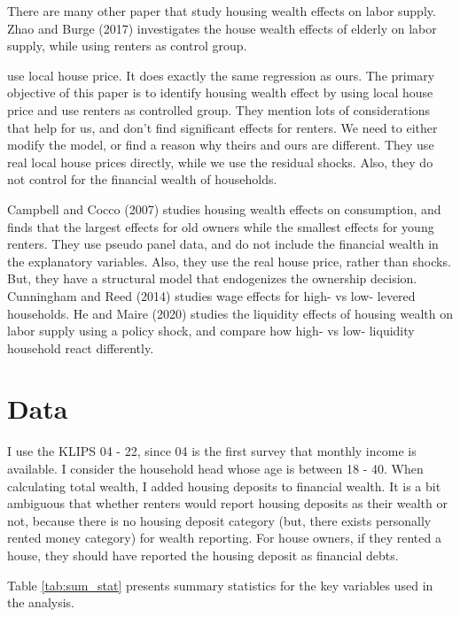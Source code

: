 \documentclass[10pt]{article}
\theoremstyle{definition}
\theoremstyle{remark}
\begin{document}
There are many other paper that study housing wealth effects on labor supply. Zhao and Burge (2017) investigates the house wealth effects of elderly on labor supply, while using renters as control group.

\cite{DG2018} use local house price. It does exactly the same regression as ours. The primary objective of this paper is to identify housing wealth effect by using local house price and use renters as controlled group. They mention lots of considerations that help for us, and don't find significant effects for renters. We need to either modify the model, or find a reason why theirs and ours are different. They use real local house prices directly, while we use the residual shocks. Also, they do not control for the financial wealth of households. 

Campbell and Cocco (2007) studies housing wealth effects on consumption, and finds that the largest effects for old owners while the smallest effects for young renters. They use pseudo panel data, and do not include the financial wealth in the explanatory variables. Also, they use the real house price, rather than shocks. But, they have a structural model that endogenizes the ownership decision. Cunningham and Reed (2014) studies wage effects for high- vs low- levered households. He and Maire (2020) studies the liquidity effects of housing wealth on labor supply using a policy shock, and compare how high- vs low- liquidity household react differently.

\section{Data}\label{sec:data}
I use the KLIPS 04 - 22, since 04 is the first survey that monthly income is available. I consider the household head whose age is between 18 - 40. When calculating total wealth, I added housing deposits to financial wealth. It is a bit ambiguous that whether renters would report housing deposits as their wealth or not, because there is no housing deposit category (but, there exists personally rented money category) for wealth reporting. For house owners, if they rented a house, they should have reported the housing deposit as financial debts.

Table \ref{tab:sum_stat} presents summary statistics for the key variables used in the analysis.
\end{document}

